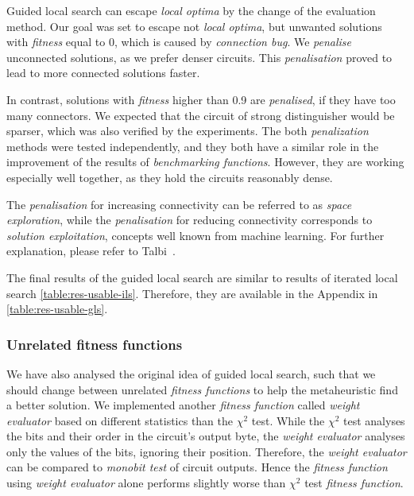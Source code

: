 \documentclass[
    digital,    %
    oneside,    %
    color,
    11pt,
    nocover,
    notable,
    nolof,
    nolot,
]{fithesis3}
\begin{document}
Guided local search can escape \textit{local optima} by the change of the evaluation method. Our goal was set to escape not \textit{local optima}, but unwanted solutions with \textit{fitness} equal to 0, which is caused by \textit{connection bug}. We \textit{penalise} unconnected solutions, as we prefer denser circuits. This \textit{penalisation} proved to lead to more connected solutions faster.

In contrast, solutions with \textit{fitness} higher than 0.9 are \textit{penalised}, if they have too many connectors. We expected that the circuit of strong distinguisher would be sparser, which was also verified by the experiments. The both \textit{penalization} methods were tested independently, and they both have a similar role in the improvement of the results of \textit{benchmarking functions}. However, they are working especially well together, as they hold the circuits reasonably dense.

The \textit{penalisation} for increasing connectivity can be referred to as \textit{space exploration}, while the \textit{penalisation} for reducing connectivity corresponds to \textit{solution exploitation}, concepts well known from machine learning. For further explanation, please refer to Talbi~\cite[Section 1.3.3, page 24]{talbi2009metaheuristics}.

The final results of the guided local search are similar to results of iterated local search \cref{table:res-usable-ils}. Therefore, they are available in the Appendix in \cref{table:res-usable-gls}.

\subsubsection{\textbf{Unrelated fitness functions}}

We have also analysed the original idea of guided local search, such that we should change between unrelated \textit{fitness functions} to help the metaheuristic find a better solution. We implemented another \textit{fitness function} called \textit{weight evaluator} based on different statistics than the $\chi^{2}$ test. While the $\chi^{2}$ test analyses the bits and their order in the circuit's output byte, the \textit{weight evaluator} analyses only the values of the bits, ignoring their position. Therefore, the \textit{weight evaluator} can be compared to \textit{monobit test} of circuit outputs. Hence the \textit{fitness function} using \textit{weight evaluator} alone performs slightly worse than $\chi^{2}$ test \textit{fitness function}.
\end{document}
